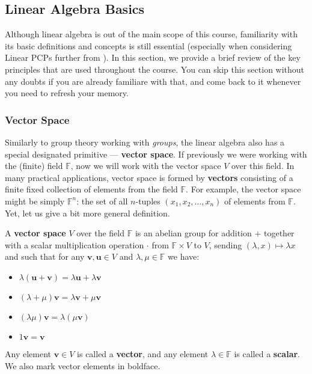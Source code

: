 \documentclass[../lecture-notes.tex]{subfiles}
\begin{document}
\subsection{Linear Algebra Basics}

Although linear algebra is out of the main scope of this course, familiarity
with its basic definitions and concepts is still essential (especially when
considering Linear PCPs further from ). In this section, we
provide a brief review of the key principles that are used throughout the
course. You can skip this section without any doubts if you are already
familiare with that, and come back to it whenever you need to refresh your
memory.

\subsubsection{Vector Space}

Similarly to group theory working with \textit{groups}, the linear algebra also has a special designated primitive --- \textbf{vector space}. If previously we were working
with the (finite) field $\mathbb{F}$, now we will work with the vector space $V$ over this field. In many practical applications,
vector space is formed by \textbf{vectors} consisting of a finite fixed collection of elements from the field $\mathbb{F}$. For example,
the vector space might be simply $\mathbb{F}^n$: the set of all $n$-tuples $(x_1,x_2,\dots,x_n)$ of elements from $\mathbb{F}$. Yet, let us give a bit more general definition.

\begin{definition}
    A \textbf{vector space} $V$ over the field $\mathbb{F}$ is an abelian group for addition $+$ together with a scalar multiplication operation $\cdot$ from $\mathbb{F} \times V$ to $V$, sending $(\lambda,x) \mapsto \lambda x$ and such that for any $\mathbf{v},\mathbf{u} \in V$ and $\lambda,\mu \in \mathbb{F}$ we have:
    \begin{itemize}
        \item $\lambda(\mathbf{u}+\mathbf{v}) = \lambda \mathbf{u} + \lambda \mathbf{v}$
        \item $(\lambda + \mu)\mathbf{v} = \lambda \mathbf{v} + \mu \mathbf{v}$
        \item $(\lambda \mu)\mathbf{v} = \lambda(\mu \mathbf{v})$
        \item $1\mathbf{v} = \mathbf{v}$
    \end{itemize}

    Any element $\mathbf{v} \in V$ is called a \textbf{vector}, and any element $\lambda \in \mathbb{F}$ is called a \textbf{scalar}. We also mark vector elements in boldface.
\end{definition}
\end{document}
